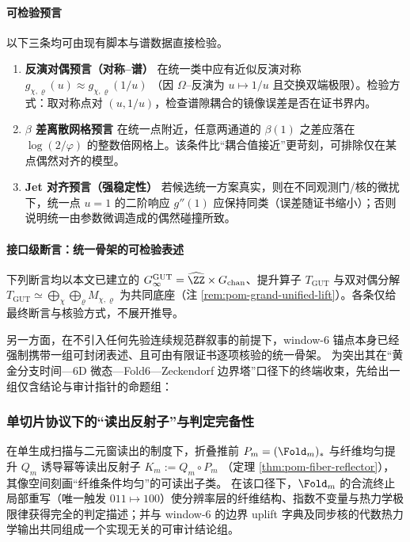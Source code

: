 \paragraph{可检验预言}
以下三条均可由现有脚本与谱数据直接检验。

\begin{enumerate}
  \item \textbf{反演对偶预言（对称--谱）} 在统一类中应有近似反演对称
  \(
  g_{\chi,\varrho}(u)\approx g_{\chi,\varrho}(1/u)
  \)
  （因 \(\Omega\)--反演为 \(u\mapsto 1/u\) 且交换双端极限）。检验方式：取对称点对 \((u,1/u)\)，检查谱隙耦合的镜像误差是否在证书界内。

  \item \textbf{\(\beta\) 差离散网格预言} 在统一点附近，任意两通道的 \(\beta(1)\) 之差应落在 \(\log(2/\varphi)\) 的整数倍网格上。该条件比“耦合值接近”更苛刻，可排除仅在某点偶然对齐的模型。

  \item \textbf{Jet 对齐预言（强稳定性）} 若候选统一方案真实，则在不同观测门/核的微扰下，统一点 \(u=1\) 的二阶响应 \(g''(1)\) 应保持同类（误差随证书缩小）；否则说明统一由参数微调造成的偶然碰撞所致。
\end{enumerate}

\paragraph{接口级断言：统一骨架的可检验表述}\label{par:gut-seven-additional-results}
下列断言均以本文已建立的 \(G_\infty^{\mathrm{GUT}}=\widehat{\ZZ}\times G_{\mathrm{chan}}\)、提升算子 \(T_{\mathrm{GUT}}\) 与双对偶分解
\(
T_{\mathrm{GUT}}\simeq\bigoplus_{\chi}\bigoplus_{\varrho}M_{\chi,\varrho}
\)
为共同底座（注 \ref{rem:pom-grand-unified-lift}）。各条仅给最终断言与核验方式，不展开推导。

另一方面，在不引入任何先验连续规范群叙事的前提下，window-\(6\) 锚点本身已经强制携带一组可封闭表述、且可由有限证书逐项核验的统一骨架。
为突出其在“黄金分支时间—6D 微态—Fold6—Zeckendorf 边界塔”口径下的终端收束，先给出一组仅含结论与审计指针的命题组：




\subsubsection{单切片协议下的“读出反射子”与判定完备性}\label{subsubsec:single-slice-reflector-completeness}
在单生成扫描与二元窗读出的制度下，折叠推前 \(P_m=(\Fold_m)_*\) 与纤维均匀提升 \(Q_m\) 诱导幂等读出反射子
\(
K_m:=Q_m\circ P_m
\)
（定理 \ref{thm:pom-fiber-reflector}），其像空间刻画“纤维条件均匀”的可读出子类。
在该口径下，\(\Fold_m\) 的合流终止局部重写（唯一触发 \(011\mapsto 100\)）使分辨率层的纤维结构、指数不变量与热力学极限律获得完全的判定描述；并与 window-\(6\) 的边界 uplift 字典及同步核的代数热力学输出共同组成一个实现无关的可审计结论组。


